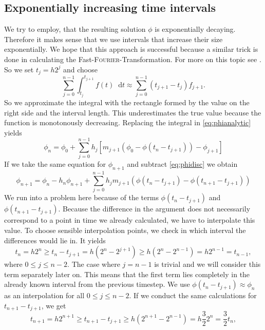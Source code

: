 \documentclass[12pt,a4paper,twoside, open=right]{scrreprt}
\theoremstyle{definition}
\theoremstyle{plain}
\newcommand{\D}{\mathop{}\!\mathrm{d}}
\begin{document}
\subsection{Exponentially increasing time intervals}
We try to employ, that the resulting solution $\phi$ is exponentially decaying. Therefore it makes sense that we use intervals that increase their size exponentially. We hope that this approach is successful because a similar trick is done in calculating the Fast-\textsc{Fourier}-Transformation. For more on this topic see \cite{Cooley1965}. So we set $t_j=h2^j$ and choose 
\begin{equation}
    \sum_{j=0}^{n-1}\int_{t_j}^{t_{j+1}}f(t)\D t\approx\sum_{j=0}^{n-1}(t_{j+1}-t_j)f_{j+1}.
\end{equation}
So we approximate the integral with the rectangle formed by the value on the right side and the interval length. This underestimates the true value because the function is monotonously decreasing. Replacing the integral in \eqref{eq:phianalytic} yields
\begin{equation}
    \phi_n = \phi_0 + \sum_{j=0}^{n-1}h_j[m_{j+1}(\phi_0-\phi(t_n-t_{j+1}))-\phi_{j+1}]\label{eq:phidisc}
\end{equation} 
If we take the same equation for $\phi_{n+1}$ and subtract \eqref{eq:phidisc} we obtain
\begin{equation}
    \phi_{n+1}= \phi_n -h_n\phi_{n+1}+\sum_{j=0}^{n-1}h_jm_{j+1}(\phi(t_n-t_{j+1})-\phi(t_{n+1}-t_{j+1}))\label{eq:phidiff}
\end{equation}
We run into a problem here because of the terms $\phi(t_n-t_{j+1})$ and $\phi(t_{n+1}-t_{j+1})$. Because the difference in the argument does not necessarily correspond to a point in time we already calculated, we have to interpolate this value. To choose sensible interpolation points, we check in which interval the differences would lie in. It yields
\begin{equation}
    t_n =h2^n\ge t_n-t_{j+1}=h(2^n-2^{j+1})\ge h(2^n-2^{n-1}) =h2^{n-1}=t_{n-1},
\end{equation}
where $0\le j\le n-2$. The case where $j=n-1$ is trivial and we will consider this term separately later on.
This means that the first term lies completely in the already known interval from the previous timestep. We use $\phi(t_n-t_{j+1})\approx\phi_n$ as an interpolation for all $0\le j\le n-2$. If we conduct the same calculations for $t_{n+1}-t_{j+1}$, we get
\begin{equation}
    t_{n+1}=h2^{n+1}\ge t_{n+1}-t_{j+1}\ge h(2^{n+1}-2^{n-1})=h\frac{3}{2}2^n=\frac{3}{2}t_n,
\end{equation}
\end{document}
